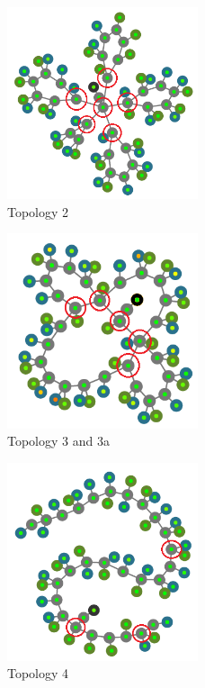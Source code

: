 \documentclass[conference]{IEEEtran}
\begin{document}
		\begin{figure}[!htp]
			\centering
				\centering
				\includegraphics[width=0.5\textwidth]{pics/topo_3.png}
				\caption{Topology 2}
				\label{img:topo_3}
		\end{figure}
	
		\begin{figure}[!htp]
			\centering
				\centering
				\includegraphics[width=0.5\textwidth]{pics/topo_4_4a.png}
				\caption{Topology 3 and 3a}
				\label{img:topo_4_4a}
		\end{figure}
	
		\begin{figure}[!htp]
			\centering
				\centering
				\includegraphics[width=0.5\textwidth]{pics/topo_5.png}
				\caption{Topology 4}
				\label{img:topo_5}
		\end{figure}
		
\end{document}
